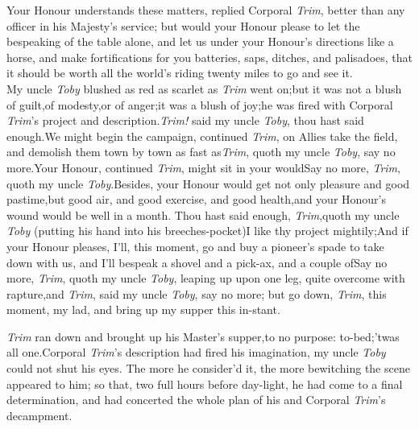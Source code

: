 \documentclass{article}
\begin{document}
Your Honour understands these matters, replied Corporal
\textit{Trim}, better than any officer in his Majesty’s
service;\tsk\break
but would your Honour please to let the bespeaking of the
table alone, and let us 
under your Honour’s directions like a horse, and make
fortifications for you
batteries, saps, ditches, and palisadoes, that it
should be worth all the world’s\break
riding twenty miles to go and see it.\\
\newpage
My uncle \textit{Toby} blushed as red as scarlet as \textit{Trim}
went on;\tsk but it was not a blush of guilt,\tsk of
modesty,\tsk or of anger;\tsk it was a blush of joy;\tsk he
was fired with Corporal \textit{Trim}’s project and
description.\tsk \textit{Trim!} said my uncle \textit{Toby}, thou
hast said enough.\tsk We might begin the campaign, continued
\textit{Trim}, on\break
{}
Allies take the field, and demolish them town by town as fast
as\tsh \textit{Trim}, quoth\break
my uncle \textit{Toby}, say no more.\tsk Your
Honour, continued \textit{Trim}, might sit in your 
would\tsh Say no more, \textit{Trim}, quoth my uncle
\textit{Toby}.\tsh Besides, your Honour would get not only
pleasure and good pastime,\tsk but good air, and good exercise,
and good health,\tsk and your Honour’s
wound would be well in a month.
Thou hast said enough, \textit{Trim},\tsk quoth my
uncle \textit{Toby} (putting his hand into\break
his breeches-pocket)\tsh I like thy project
mightily;\tsk And if your Honour pleases, I’ll, this moment,
go and buy a pioneer’s spade to take down with us, and
I’ll bespeak a shovel and a pick-ax, and a couple
of\tsh Say no more, \textit{Trim}, quoth my\break
uncle \textit{Toby}, leaping up upon one leg,\break
quite overcome with rapture,\tsk and\break
{}
\textit{Trim}, said my uncle \textit{Toby}, say no
more;\tsk\break
but go down, \textit{Trim}, this moment, my\break
lad, and bring up my supper this in-\break stant.

\textit{Trim} ran down and brought up his Master’s
supper,\tsk to no purpose:\tsh\break
{}
to-bed;\tsk ’twas all one.\tsk Corporal \textit{Trim}’s
description had fired his imagination,\tsk\break
my uncle \textit{Toby} could not shut his eyes.\tsk\break
The more he consider’d it, the more 
bewitching the scene appeared to him;\tsk\break
so that, two full hours before day-light, he had
come to a final determination,\break
and had concerted the whole plan of his\break
and Corporal \textit{Trim}’s decampment.
\end{document}
